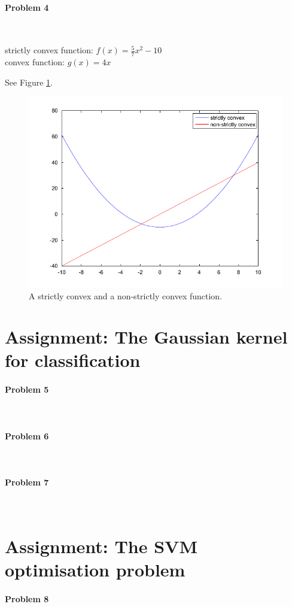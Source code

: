\documentclass{article}
\begin{document}
\paragraph*{Problem 4}
$\;$ 

strictly convex function: $f(x) = \frac{5}{7}x^2-10$\\
convex function: $g(x) = 4x$

See Figure \ref{convex}.

\begin{figure}[]
\centering
\includegraphics{convex.pdf}
\caption{A strictly convex and a non-strictly convex function.}
\label{convex}
\end{figure}


\section{Assignment: The Gaussian kernel for classification}
\paragraph*{Problem 5}
$\;$



\paragraph*{Problem 6}
$\;$ 

\paragraph*{Problem 7}
$\;$ 

\section{Assignment: The SVM optimisation problem}
\paragraph*{Problem 8}
$\;$ 
\end{document}
